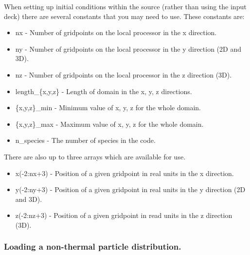When setting up initial conditions within the {\EPOCH} source (rather than
using the input deck)
there are several constants that you may need to use. These constants are:
\begin{itemize}
\item nx - Number of gridpoints on the local processor in the x direction.
\item ny - Number of gridpoints on the local processor in the y direction (2D
  and 3D).
\item nz - Number of gridpoints on the local processor in the z direction (3D).
\item length\_\{x,y,z\} - Length of domain in the x, y, z directions.
\item \{x,y,z\}\_min - Minimum value of x, y, z for the whole domain.
\item \{x,y,z\}\_max - Maximum value of x, y, z for the whole domain.
\item n\_species - The number of species in the code.
\end{itemize}

There are also up to three arrays which are available for use.
\begin{itemize}
\item x(-2:nx+3) - Position of a given gridpoint in real units in the x
  direction.
\item y(-2:ny+3) - Position of a given gridpoint in real units in the y
  direction (2D and 3D).
\item z(-2:nz+3) - Position of a given gridpoint in read units in the z
  direction (3D).
\end{itemize}

\subsubsection{Loading a non-thermal particle distribution.}

